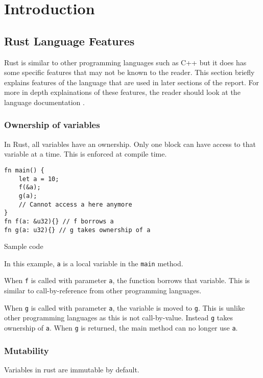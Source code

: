\chapter{Introduction}


\section{Rust Language Features}
Rust is similar to other programming languages such as C++ but it does has some specific features that may not be known to the reader. This section briefly explains features of the language that are used in later sections of the report. For more in depth explainations of these features, the reader should look at the language documentation \parencite{rustbook}.

\subsection{Ownership of variables}
In Rust, all variables have an ownership. Only one block can have access to that variable at a time. This is enforced at compile time.

\begin{code}
\begin{verbatim}
fn main() {
    let a = 10;
    f(&a);
    g(a);
    // Cannot access a here anymore
}
fn f(a: &u32){} // f borrows a
fn g(a: u32){} // g takes ownership of a
\end{verbatim}
\caption{Sample code}
\end{code}

In this example, \texttt{a} is a local variable in the \texttt{main} method.

When \texttt{f} is called with parameter \texttt{a}, the function borrows that variable. This is similar to call-by-reference from other programming languages.

When \texttt{g} is called with parameter \texttt{a}, the variable is moved to \texttt{g}. This is unlike other programming languages as this is not call-by-value. Instead \texttt{g} takes ownership of \texttt{a}. When \texttt{g} is returned, the main method can no longer use \texttt{a}.


\subsection{Mutability}
Variables in rust are immutable by default.
